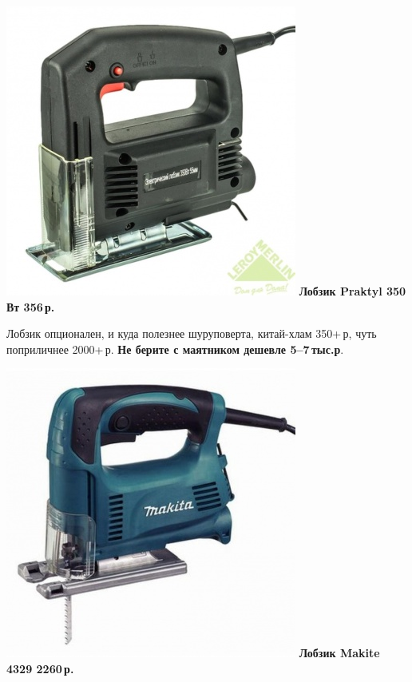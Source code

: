 \documentclass{magazine}
\begin{document}
{\noindent\href{http://leroymerlin.ru/catalogue/instrumenty/elektroinstrument/lobziki/13805991/}{
\includegraphics[width=\columnwidth]{fig/00/LobzPraktyl.jpg}}
\textbf{Лобзик Praktyl 350 Вт 356\,р.}

Лобзик опционален, и куда полезнее шуруповерта, китай-хлам 
350+\,р, чуть поприличнее 2000+\,р. 
\textbf{Не берите с маятником дешевле 5--7\,тыс.р}.

\noindent\href{http://leroymerlin.ru/catalogue/instrumenty/elektroinstrument/lobziki/12114283/}{
\includegraphics[width=\columnwidth]{fig/00/LobzMakita4329.jpg}}
\textbf{Лобзик Makite 4329 2260\,р.}

}
\end{document}
